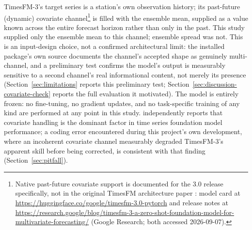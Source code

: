 TimesFM-3's target series is a station's own observation history; its
past-future (dynamic) covariate channel\footnote{Native past-future
covariate support is documented for the 3.0 release specifically, not in
the original TimesFM architecture paper \citep{das_2024_timesfm_icml}: model
card at \url{https://huggingface.co/google/timesfm-3.0-pytorch} and
release notes at
\url{https://research.google/blog/timesfm-3-a-zero-shot-foundation-model-for-multivariate-forecasting/}
(Google Research; both accessed 2026-09-07).} is filled with the ensemble mean,
supplied as a value known across the entire forecast horizon rather than
only in the past. This study supplied only the ensemble mean to this
channel; ensemble spread was not. This is an input-design choice, not a
confirmed architectural limit: the installed package's own source
documents the channel's accepted shape as genuinely multi-channel, and a
preliminary test confirms the model's output is measurably sensitive to
a second channel's real informational content, not merely its presence
(Section~\ref{sec:limitations} reports this preliminary test;
Section~\ref{sec:discussion-covariate-check} reports the full evaluation
it motivated). The model is entirely frozen: no fine-tuning,
no gradient updates, and no task-specific training of any kind are
performed at any point in this study.
\citet{kreusel_2026_covariates_key} independently reports that covariate
handling is the dominant factor in time series foundation model
performance; a coding error encountered during this project's own
development, where an incoherent covariate channel measurably degraded
TimesFM-3's apparent skill before being corrected, is consistent with that
finding (Section~\ref{sec:pitfall}).

